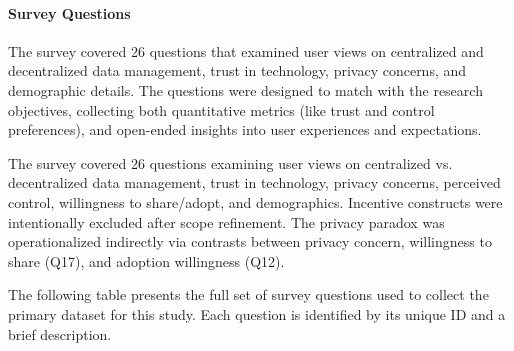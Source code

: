 \paragraph{Survey Questions}
The survey covered 26 questions that examined user views on centralized and decentralized data management, trust in technology, privacy concerns, and demographic details. The questions were designed to match with the research objectives, collecting both quantitative metrics (like trust and control preferences), and open-ended insights into user experiences and expectations.

The survey covered 26 questions examining user views on centralized vs. decentralized data management, trust in technology, privacy concerns, perceived control, willingness to share/adopt, and demographics. Incentive constructs were intentionally excluded after scope refinement. The privacy paradox was operationalized indirectly via contrasts between privacy concern, willingness to share (Q17), and adoption willingness (Q12).

	The following table presents the full set of survey questions used to collect the primary dataset for this study. Each question is identified by its unique ID and a brief description.

